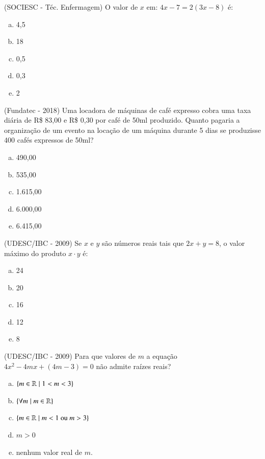  \begin{exer}
 (SOCIESC - Téc. Enfermagem) O valor de $x$ em: $4x-7=2(3x-8)$ é:
 \begin{enumerate}[a)]
  \item 4,5
  \item 18
  \item 0,5
  \item 0,3
  \item 2
 \end{enumerate}
 \end{exer}

 \begin{exer}
 (Fundatec - 2018) Uma locadora de máquinas de café expresso cobra uma taxa diária de R\$ 83,00 e R\$ 0,30 por café de 50ml produzido. Quanto pagaria a organização de um evento na locação de um máquina durante 5 dias se produzisse 400 cafés expressos de 50ml?
\begin{multicols}{2}
\begin{enumerate}[a)]
\item 490,00
\item 535,00
\item 1.615,00
\item 6.000,00
\item 6.415,00
\end{enumerate}
\end{multicols}
 \end{exer}

 \begin{exer}
 (UDESC/IBC - 2009) Se $x$ e $y$ são números reais tais que $2x + y = 8$, o valor máximo do produto $x \cdot y$ é:
 \begin{enumerate}[a)]
 \item 24
 \item 20
 \item 16
 \item 12
 \item 8
 \end{enumerate}
 \end{exer}

 \begin{exer}
 (UDESC/IBC - 2009) Para que valores de $m$ a equação $4x^2- 4mx + (4m - 3) = 0$ não admite raízes reais?
 \begin{enumerate}[a)]
 \item $\{m \in \mathbb{R} \mid 1< m < 3\}$
 \item $\{\forall m \mid m \in \mathbb{R}\}$
 \item $\{m \in \mathbb{R} \mid m < 1 \text{ ou } m > 3\}$
 \item $m > 0$
 \item nenhum valor real de $m$.
 \end{enumerate}
 \end{exer}

